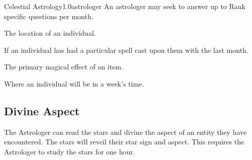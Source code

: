 \documentclass[a4paper]{article}
\begin{document}
\begin{skill}{Celestial Astrology}{1.0}{astrologer}
An astrologer may seek to answer up to Rank specific questions per
month.

\begin{example}
\begin{Itemize}
\item The location of an individual.
\item If an individual has had a particular spell cast upon them with the last month.
\item The primary magical effect of an item.
\item Where an individual will be in a week's time.
\end{Itemize}
\end{example}

\subsection{Divine Aspect}

The Astrologer can read the stars and divine the aspect of an entity
they have encountered.  The stars will reveil their star sign and
aspect.  This requires the Astrologer to study the stars for one hour.

\end{skill}
\end{document}
